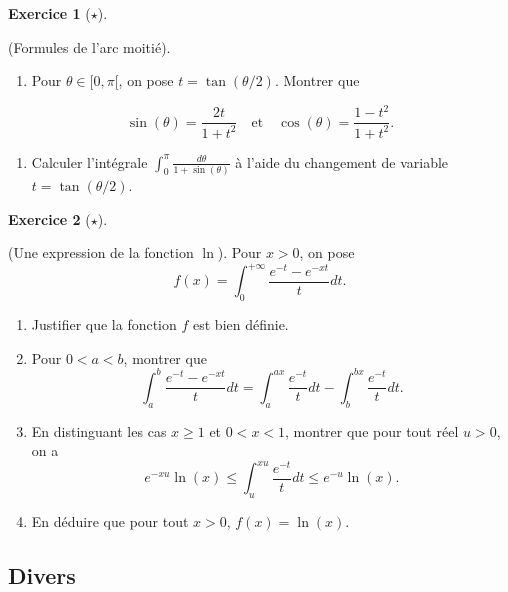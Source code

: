 \documentclass[
  french,
  letterpaper,
  DIV=11,
  numbers=noendperiod]{scrreprt}
\providecommand{\tightlist}{%
  \setlength{\itemsep}{0pt}\setlength{\parskip}{0pt}}
\theoremstyle{plain}
\theoremstyle{definition}
\theoremstyle{plain}
\theoremstyle{plain}
\theoremstyle{definition}
\newtheorem{exercise}{Exercice}[chapter]
\theoremstyle{definition}
\theoremstyle{plain}
\theoremstyle{remark}
\begin{document}
\begin{exercise}[\(\star\)]\protect\hypertarget{exr-01-cht-var-2}{}\label{exr-01-cht-var-2}

(Formules de l'arc moitié).

\begin{enumerate}
\def\labelenumi{\arabic{enumi}.}
\tightlist
\item
  Pour \(\theta \in [0,\pi[\), on pose \(t=\tan(\theta/2)\). Montrer que
\end{enumerate}

\[
\sin(\theta) = \frac{2t}{1+t^{2}}\quad \text{et}\quad \cos(\theta)=\frac{1-t^{2}}{1+t^{2}}.
\]

\begin{enumerate}
\def\labelenumi{\arabic{enumi}.}
\setcounter{enumi}{1}
\tightlist
\item
  Calculer l'intégrale
  \(\displaystyle\int_0^\pi\frac{d\theta}{1+\sin(\theta)}\) à l'aide du
  changement de variable \(t=\tan(\theta/2)\).
\end{enumerate}

\end{exercise}

\begin{exercise}[\(\star\)]\protect\hypertarget{exr-01-ln}{}\label{exr-01-ln}

(Une expression de la fonction \(\ln\)). Pour \(x>0\), on pose
\[f(x) = \int_0^{+\infty}\frac{e^{-t}-e^{-xt}}{t}dt.\]

\begin{enumerate}
\def\labelenumi{\arabic{enumi}.}
\item
  Justifier que la fonction \(f\) est bien définie.
\item
  Pour \(0<a<b\), montrer que
  \[\int_a^b \frac{e^{-t}-e^{-xt}}{t}dt = \int_a^{ax}\frac{e^{-t}}{t}dt - \int_b^{bx}\frac{e^{-t}}{t}dt.\]
\item
  En distinguant les cas \(x\geqslant 1\) et \(0<x<1\), montrer que pour
  tout réel \(u>0\), on a
  \[e^{-xu}\ln(x)\leqslant \int_u^{xu} \frac{e^{-t}}{t}dt\leqslant e^{-u}\ln(x).\]
\item
  En déduire que pour tout \(x>0\), \(f(x) = \ln(x)\).
\end{enumerate}

\end{exercise}

\subsection{Divers}\label{divers}
\end{document}
